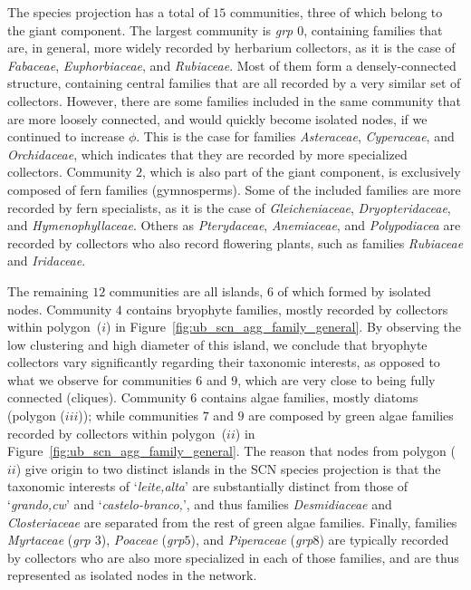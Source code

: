 The species projection has a total of $15$ communities, three of which belong to the giant component. 
%
The largest community is \textit{grp $0$}, containing families that are, in general, more widely recorded by herbarium collectors, as it is the case of \textit{Fabaceae}, \textit{Euphorbiaceae}, and \textit{Rubiaceae}.
Most of them form a densely-connected structure, containing central families that are all recorded by a very similar set of collectors.
However, there are some families included in the same community that are more loosely connected, and would quickly become isolated nodes, if we continued to increase $\phi$. 
This is the case for families \textit{Asteraceae}, \textit{Cyperaceae}, and \textit{Orchidaceae}, which indicates that they are recorded by more specialized collectors.
Community $2$, which is also part of the giant component, is exclusively composed of fern families (gymnosperms).
Some of the included families are more recorded by fern specialists, as it is the case of \textit{Gleicheniaceae}, \textit{Dryopteridaceae}, and \textit{Hymenophyllaceae}.
Others as \textit{Pterydaceae}, \textit{Anemiaceae}, and \textit{Polypodiacea} are recorded by collectors who also record flowering plants, such as families \textit{Rubiaceae} and \textit{Iridaceae}.


The remaining $12$ communities are all islands, $6$ of which formed by isolated nodes.
%
Community $4$ contains bryophyte families, mostly recorded by collectors within polygon~($i$) in Figure~\ref{fig:ub_scn_agg_family_general}.
By observing the low clustering and high diameter of this island, we conclude that bryophyte collectors vary significantly regarding their taxonomic interests, as opposed to what we observe for communities $6$ and $9$, which are very close to being fully connected (cliques).
Community $6$ contains algae families, mostly diatoms (polygon ($iii$));
%
while communities $7$ and $9$ are composed by green algae families recorded by collectors within polygon~($ii$) in Figure~\ref{fig:ub_scn_agg_family_general}.
The reason that nodes from polygon ($ii$) give origin to two distinct islands in the SCN species projection is that the taxonomic interests of `\textit{leite,alta}' are substantially distinct from those of `\textit{grando,cw}' and `\textit{castelo-branco,}', and thus families \textit{Desmidiaceae} and \textit{Closteriaceae} are separated from the rest of green algae families.
Finally, families \textit{Myrtaceae} (\textit{grp $3$}), \textit{Poaceae} (\textit{grp$5$}), and \textit{Piperaceae} (\textit{grp$8$}) are typically recorded by collectors who are also more specialized in each of those families, and are thus represented as isolated nodes in the network.


